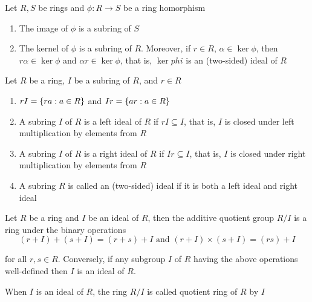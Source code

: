 \begin{proposition}
	Let $R, S$ be rings and $\phi: R \to S$ be a ring homorphism
	\begin{enumerate}
		\item The image of $\phi$ is a subring of $S$
		\item The kernel of $\phi$ is a subring of $R$. Moreover, if $r \in R$, $\alpha \in \ker \phi$, then $r \alpha \in \ker \phi$ and $\alpha r \in \ker \phi$, that is, $\ker phi$ is an (two-sided) ideal of $R$
	\end{enumerate}
\end{proposition}

\begin{definition}[ideal]
	Let $R$ be a ring, $I$ be a subring of $R$, and $r \in R$
	\begin{enumerate}
		\item $rI = \{ra: a \in R\}$ and $Ir = \{ar: a \in R\}$
		
		\item A subring $I$ of $R$ is a left ideal of $R$ if $rI \subseteq I$, that is, $I$ is closed under left multiplication by elements from $R$
		
		\item A subring $I$ of $R$ is a right ideal of $R$ if $Ir \subseteq I$, that is, $I$ is closed under right multiplication by elements from $R$
			
		\item A subring $R$ is called an (two-sided) ideal if it is both a left ideal and right ideal
	\end{enumerate}
	
\end{definition}

\begin{proposition}
	Let $R$ be a ring and $I$ be an ideal of $R$, then the additive quotient group $R/I$ is a ring under the binary operations
	$$
		(r + I) + (s + I) = (r + s) + I \text{ and } (r + I) \times (s + I) = (rs) + I
	$$
	
	for all $r, s \in R$. Conversely, if any subgroup $I$ of $R$ having the above operations well-defined then $I$ is an ideal of $R$.
\end{proposition}

\begin{definition}
	When $I$ is an ideal of $R$, the ring $R/I$ is called quotient ring of $R$ by $I$
\end{definition}

